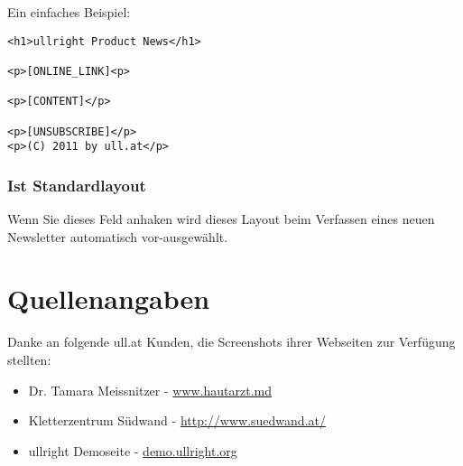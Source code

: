 \documentclass[article, a4paper, oneside, 11pt]{memoir}
\begin{document}
Ein einfaches Beispiel:

\begin{lstlisting}
<h1>ullright Product News</h1>

<p>[ONLINE_LINK]<p>

<p>[CONTENT]</p>

<p>[UNSUBSCRIBE]</p>
<p>(C) 2011 by ull.at</p>
\end{lstlisting}

\subsection{Ist Standardlayout}

Wenn Sie dieses Feld anhaken wird dieses Layout beim Verfassen eines neuen Newsletter automatisch vor-ausgewählt.





\chapter{Quellenangaben}

Danke an folgende ull.at Kunden, die Screenshots ihrer Webseiten zur Verfügung stellten:

\begin{itemize}
\item Dr. Tamara Meissnitzer - \href{http://www.hautarzt.md}{www.hautarzt.md}
\item Kletterzentrum Südwand - \href{http://http://www.suedwand.at/}{http://www.suedwand.at/}
\item ullright Demoseite - \href{http://demo.ullright.org}{demo.ullright.org}
\end{itemize}
\end{document}
